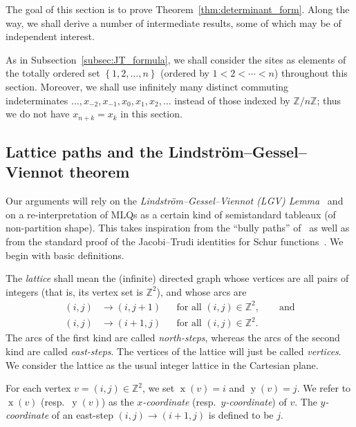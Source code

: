\documentclass[reqno]{amsart}
\newcommand{\0}{\phantom{c}}
\DeclareMathOperator{\xcoord}{x} %
\DeclareMathOperator{\ycoord}{y} %
\newcommand{\ZZ}{\mathbb{Z}}
\newenvironment{verlong}{}{}
\newcommand{\set}[1]{\left\{ #1 \right\}}
\newcommand{\defn}[1]{{\color{darkred}\emph{#1}}} %
\theoremstyle{plain}
\theoremstyle{definition}
\numberwithin{equation}{section}
\begin{document}
The goal of this section is to prove Theorem~\ref{thm:determinant_form}.
Along the way, we shall derive a number of intermediate results, some of which may be of independent interest.

As in Subsection~\ref{subsec:JT_formula}, we shall consider the sites as elements of the totally ordered set $\set{1, 2, \ldots, n}$ (ordered by $1 < 2 < \cdots < n$) throughout this section.
Moreover, we shall use infinitely many distinct commuting indeterminates $\ldots, x_{-2}, x_{-1}, x_0, x_1, x_2, \ldots$ instead of those indexed by $\ZZ/n\ZZ$; thus we do not have $x_{n+k} = x_k$ in this section.

\subsection{Lattice paths and the Lindstr\"{o}m--Gessel--Viennot theorem}

Our arguments will rely on the \defn{Lindstr\"om--Gessel--Viennot (LGV) Lemma}~\cite{GV85,Lindstrom73} and on a re-interpretation of MLQs as a certain kind of semistandard tableaux (of non-partition shape).
This takes inspiration from the ``bully paths'' of~\cite{AasLin17} as well as from the standard proof of the Jacobi--Trudi identities for Schur functions~\cite[First proof of Theorem 7.16.1]{Stanley-EC2}.
We begin with basic definitions.

The \defn{lattice} shall mean the (infinite) directed graph whose vertices are
all pairs of integers (that is, its vertex set is $\ZZ^2$), and whose arcs are
\begin{align*}
(i,j) & \to (i,j+1) & & \text{for all } (i,j) \in \ZZ^2, \qquad \text{and} \\
(i,j) & \to (i+1,j) & & \text{for all } (i,j) \in \ZZ^2.
\end{align*}
The arcs of the first kind are called \defn{north-steps}, whereas the arcs of
the second kind are called \defn{east-steps}.
\begin{verlong}
The vertices of the lattice will just be called \defn{vertices}.
\end{verlong}
We consider the lattice as the usual integer lattice in the Cartesian plane.

For each vertex $v = (i,j) \in \ZZ^2$, we set $\xcoord(v) = i$ and $\ycoord(v) = j$.
We refer to $\xcoord(v)$ (resp.~$\ycoord(v)$) as the \defn{$x$-coordinate} (resp.~\defn{$y$-coordinate}) of $v$.
The \defn{$y$-coordinate} of an east-step $(i,j) \to (i+1, j)$ is defined to be $j$.
\end{document}
